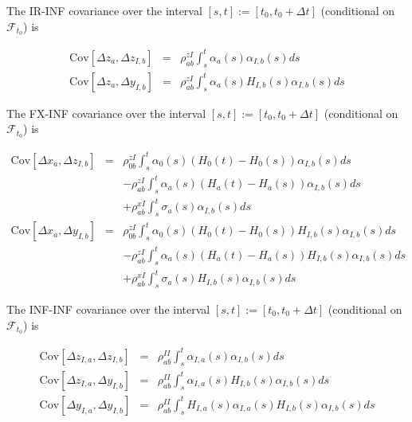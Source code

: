 \documentclass[12pt, a4paper]{article}
\begin{document}
{{\begin{appendix}
The IR-INF covariance over the interval $[s,t] := [t_0, t_0+\Delta t]$ (conditional on $\mathcal{F}_{t_0}$) is

\begin{eqnarray*}
  \mathrm{Cov}[ \Delta z_a, \Delta z_{I,b} ] & = & \rho_{ab}^{zI} \int_s^t \alpha_a(s) \alpha_{I,b}(s) ds \\
  \mathrm{Cov}[ \Delta z_a, \Delta y_{I,b} ] & = & \rho_{ab}^{zI} \int_s^t \alpha_a(s) H_{I,b}(s) \alpha_{I,b}(s) ds
\end{eqnarray*}

The FX-INF covariance over the interval $[s,t] := [t_0, t_0+\Delta t]$ (conditional on $\mathcal{F}_{t_0}$) is

\begin{eqnarray*}
  \mathrm{Cov}[ \Delta x_a, \Delta z_{I,b} ] & = & \rho_{0b}^{zI} \int_s^t \alpha_0(s) (H_0(t)-H_0(s)) \alpha_{I,b}(s) ds \\
                                             & & -\rho_{ab}^{zI} \int_s^t \alpha_a(s)(H_a(t)-H_a(s))\alpha_{I,b}(s) ds \\
                                             & & +\rho_{ab}^{xI}\int_s^t \sigma_a(s) \alpha_{I,b}(s) ds \\
  \mathrm{Cov}[ \Delta x_a, \Delta y_{I,b} ] & = & \rho_{0b}^{zI} \int_s^t \alpha_0(s) (H_0(t)-H_0(s)) H_{I,b}(s)\alpha_{I,b}(s) ds \\
                                             & & -\rho_{ab}^{zI} \int_s^t \alpha_a(s)(H_a(t)-H_a(s))H_{I,b}(s)\alpha_{I,b}(s) ds \\
                                             & & +\rho_{ab}^{xI}\int_s^t \sigma_a(s) H_{I,b}(s)\alpha_{I,b}(s) ds
\end{eqnarray*}

The INF-INF covariance over the interval $[s,t] := [t_0, t_0+\Delta t]$ (conditional on $\mathcal{F}_{t_0}$) is

\begin{eqnarray*}
  \mathrm{Cov}[ \Delta z_{I,a}, \Delta z_{I,b} ] & = & \rho_{ab}^{II} \int_s^t \alpha_{I,a}(s) \alpha_{I,b}(s) ds \\
  \mathrm{Cov}[ \Delta z_{I,a}, \Delta y_{I,b} ] & = & \rho_{ab}^{II} \int_s^t \alpha_{I,a}(s) H_{I,b}(s)
                                                       \alpha_{I,b}(s) ds \\
  \mathrm{Cov}[ \Delta y_{I,a}, \Delta y_{I,b} ] & = & \rho_{ab}^{II} \int_s^t H_{I,a}(s) \alpha_{I,a}(s) H_{I,b}(s) \alpha_{I,b}(s) ds
\end{eqnarray*}


\end{appendix}}}
\end{document}
